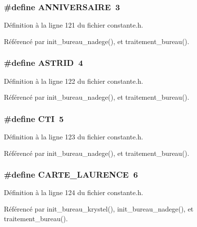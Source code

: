 \subsubsection{\setlength{\rightskip}{0pt plus 5cm}\#define ANNIVERSAIRE~3}\label{constante_8h_21c21e5a4f28b6d1d2c2eb8400e8a6d8}




D\'{e}finition \`{a} la ligne 121 du fichier constante.h.

R\'{e}f\'{e}renc\'{e} par init\_\-bureau\_\-nadege(), et traitement\_\-bureau().
\subsubsection{\setlength{\rightskip}{0pt plus 5cm}\#define ASTRID~4}\label{constante_8h_f7e222f5382da6a6e5e4d47e7dfae2e8}




D\'{e}finition \`{a} la ligne 122 du fichier constante.h.

R\'{e}f\'{e}renc\'{e} par init\_\-bureau\_\-nadege(), et traitement\_\-bureau().
\subsubsection{\setlength{\rightskip}{0pt plus 5cm}\#define CTI~5}\label{constante_8h_638bf3f8f1ba052f77658ee8cde894a0}




D\'{e}finition \`{a} la ligne 123 du fichier constante.h.

R\'{e}f\'{e}renc\'{e} par init\_\-bureau\_\-nadege(), et traitement\_\-bureau().
\subsubsection{\setlength{\rightskip}{0pt plus 5cm}\#define CARTE\_\-LAURENCE~6}\label{constante_8h_e1273ba66c54e716e0537edd7cb8dc65}




D\'{e}finition \`{a} la ligne 124 du fichier constante.h.

R\'{e}f\'{e}renc\'{e} par init\_\-bureau\_\-krystel(), init\_\-bureau\_\-nadege(), et traitement\_\-bureau().
